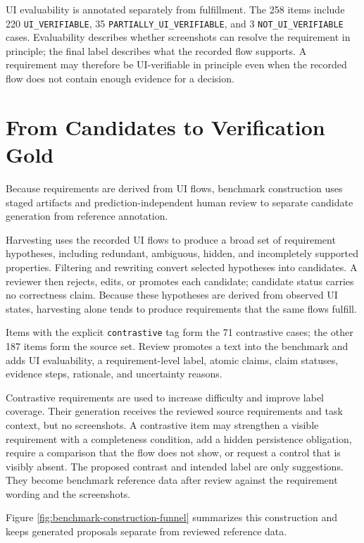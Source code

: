UI evaluability is annotated separately from fulfillment. The 258 items include
220 \texttt{UI\_VERIFIABLE}, 35 \texttt{PARTIALLY\_\allowbreak UI\_\allowbreak VERIFIABLE}, and 3
\texttt{NOT\_UI\_VERIFIABLE} cases. Evaluability describes whether screenshots can
resolve the requirement in principle; the final label describes what the
recorded flow supports. A requirement may therefore be UI-verifiable in
principle even when the recorded flow does not contain enough evidence for a
decision.

\section{From Candidates to Verification Gold}\label{from-candidates-to-verification-gold}

Because requirements are derived from UI flows, benchmark construction uses
staged artifacts and prediction-independent human review to separate candidate
generation from reference annotation.

Harvesting uses the recorded UI flows to produce a broad set of requirement
hypotheses, including redundant, ambiguous, hidden, and incompletely supported
properties. Filtering and rewriting convert selected hypotheses into
candidates. A reviewer then rejects, edits, or promotes each candidate;
candidate status carries no correctness claim. Because these hypotheses are
derived from observed UI states, harvesting alone tends to produce requirements
that the same flows fulfill.

Items with the explicit \texttt{contrastive} tag form the 71 contrastive cases; the
other 187 items form the source set. Review promotes a text into the benchmark
and adds UI evaluability, a requirement-level label, atomic claims, claim
statuses, evidence steps, rationale, and uncertainty reasons.

Contrastive requirements are used to increase difficulty and improve label
coverage. Their generation receives the reviewed source requirements and task
context, but no screenshots. A contrastive item may strengthen a visible
requirement with a completeness condition, add a hidden persistence obligation,
require a comparison that the flow does not show, or request a control that is
visibly absent. The proposed contrast and intended label are only suggestions.
They become benchmark reference data after review against the requirement
wording and the screenshots.

Figure \ref{fig:benchmark-construction-funnel} summarizes this construction and
keeps generated proposals separate from reviewed reference data.


